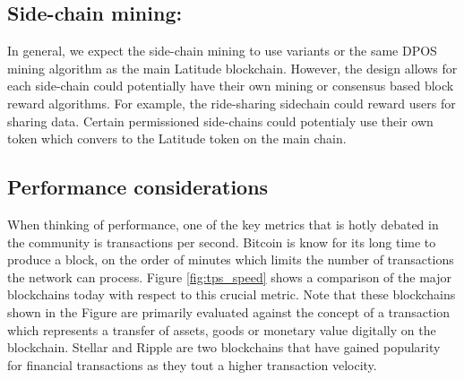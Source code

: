 \subsection{Side-chain mining:}

In general, we expect the side-chain mining to use variants or the same DPOS mining algorithm as the main Latitude
blockchain.  However, the design allows for each side-chain could potentially have their own mining or consensus based
block reward algorithms. For example, the ride-sharing sidechain could reward users for sharing data. Certain
permissioned side-chains could potentialy use their own token which convers to the Latitude token on the main chain.

\subsection{Performance considerations}
When thinking of performance, one of the key metrics that is hotly debated in the community is transactions per second.
Bitcoin is know for its long time to produce a block, on the order of minutes which limits the number of transactions
the network can process. Figure \ref{fig:tps_speed} shows a comparison of the major blockchains today with respect to
this crucial metric. Note that these blockchains shown in the Figure are primarily evaluated against the concept of a
transaction which represents a transfer of assets, goods or monetary value digitally on the blockchain. Stellar and
Ripple are two blockchains that have gained popularity for financial transactions as they tout a higher transaction
velocity. 

